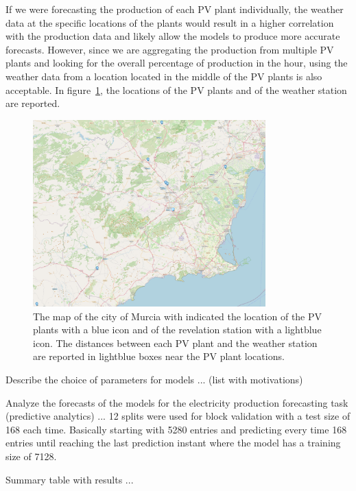 If we were forecasting the production of each PV plant individually, the weather data at the specific locations of the plants would result in a higher correlation with the production data and likely allow the models to produce more accurate forecasts.
However, since we are aggregating the production from multiple PV plants and looking for the overall percentage of production in the hour, using the weather data from a location located in the middle of the PV plants is also acceptable.
In figure~\ref{fig:pvplantsmap}, the locations of the PV plants and of the weather station are reported.

\begin{figure}[H]
\centering
\includegraphics[width=0.8\textwidth]{images/production/pv_plants_map}
\caption{The map of the city of Murcia with indicated the location of the PV plants with a blue icon and of the revelation station with a lightblue icon. The distances between each PV plant and the weather station are reported in lightblue boxes near the PV plant locations.}
\label{fig:pvplantsmap}
\end{figure}

Describe the choice of parameters for models ... (list with motivations)

Analyze the forecasts of the models for the electricity production forecasting task (predictive analytics) ...
12 splits were used for block validation with a test size of 168 each time.
Basically starting with 5280 entries and predicting every time 168 entries until reaching the last prediction instant where the model has a training size of 7128. %

Summary table with results ...


